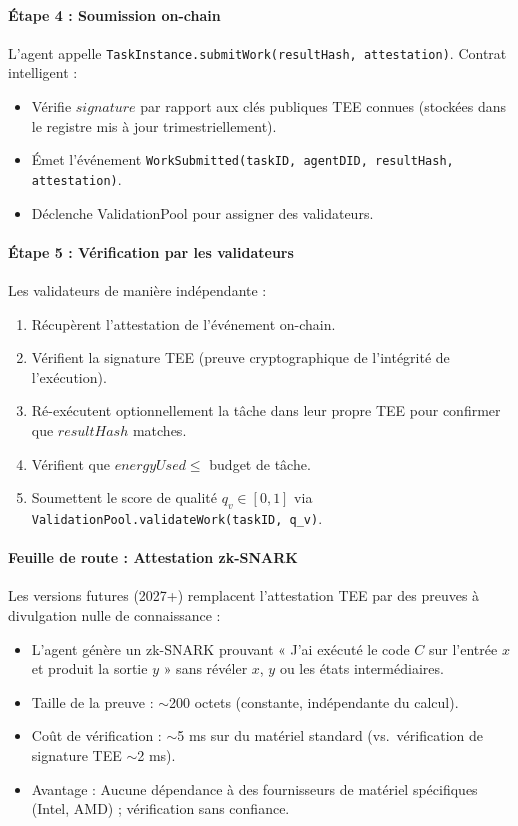 \documentclass[11pt]{article}
\begin{document}
\paragraph{Étape 4 : Soumission on-chain}
L'agent appelle \texttt{TaskInstance.submitWork(resultHash, attestation)}. Contrat intelligent :
\begin{itemize}[noitemsep]
  \item Vérifie $signature$ par rapport aux clés publiques TEE connues (stockées dans le registre mis à jour trimestriellement).
  \item Émet l'événement \texttt{WorkSubmitted(taskID, agentDID, resultHash, attestation)}.
  \item Déclenche ValidationPool pour assigner des validateurs.
\end{itemize}

\paragraph{Étape 5 : Vérification par les validateurs}
Les validateurs de manière indépendante :
\begin{enumerate}[noitemsep]
  \item Récupèrent l'attestation de l'événement on-chain.
  \item Vérifient la signature TEE (preuve cryptographique de l'intégrité de l'exécution).
  \item Ré-exécutent optionnellement la tâche dans leur propre TEE pour confirmer que $resultHash$ matches.
  \item Vérifient que $energyUsed \leq$ budget de tâche.
  \item Soumettent le score de qualité $q_v \in [0,1]$ via \texttt{ValidationPool.validateWork(taskID, q\_v)}.
\end{enumerate}

\paragraph{Feuille de route : Attestation zk-SNARK}
Les versions futures (2027+) remplacent l'attestation TEE par des preuves à divulgation nulle de connaissance :
\begin{itemize}[noitemsep]
  \item L'agent génère un zk-SNARK prouvant « J'ai exécuté le code $C$ sur l'entrée $x$ et produit la sortie $y$ » sans révéler $x$, $y$ ou les états intermédiaires.
  \item Taille de la preuve : $\sim$200 octets (constante, indépendante du calcul).
  \item Coût de vérification : $\sim$5 ms sur du matériel standard (vs.\ vérification de signature TEE $\sim$2 ms).
  \item Avantage : Aucune dépendance à des fournisseurs de matériel spécifiques (Intel, AMD) ; vérification sans confiance.
\end{itemize}
\end{document}
